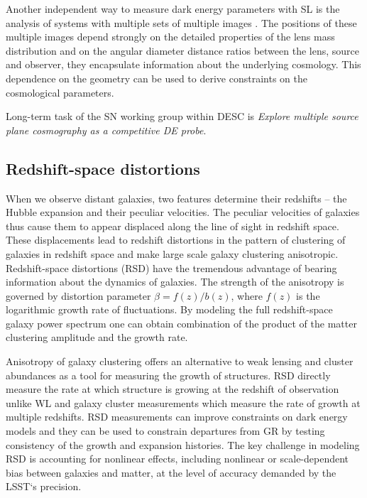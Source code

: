 Another independent way to measure dark energy parameters with SL is the analysis of systems with multiple sets of multiple images \textcite{SL_in_CLGs}. The positions of these multiple images depend strongly on the detailed properties of the lens mass distribution and on the angular diameter distance ratios between the lens, source and observer, they encapsulate information about the underlying cosmology. This dependence on the geometry can be used to derive constraints on the cosmological parameters.

Long-term task of the SN working group within DESC is \textit{Explore multiple source plane cosmography as a competitive DE probe}.
\subsection{Redshift-space distortions}
When we observe distant galaxies, two features determine their redshifts -- the Hubble expansion and their peculiar velocities. The peculiar velocities of galaxies thus cause them to appear displaced along the line of sight in redshift space. These displacements lead to redshift distortions in the pattern of clustering of galaxies in redshift space and make large scale galaxy clustering anisotropic. Redshift-space distortions (RSD) have the tremendous advantage of bearing information about the dynamics of galaxies. The strength of the anisotropy is governed by distortion parameter $\beta = f(z)/b(z)$, where $f(z)$ is the logarithmic growth rate of fluctuations. By modeling the full redshift-space galaxy power spectrum one can obtain combination of the product of the matter clustering amplitude and the growth rate.

Anisotropy of galaxy clustering offers an alternative to weak lensing and cluster abundances as a tool for measuring the growth of structures. RSD directly measure the rate at which structure is growing at the redshift of observation unlike WL and galaxy cluster measurements  which measure the rate of growth at multiple redshifts. RSD measurements can improve constraints on dark energy models and they can be used to constrain departures from GR by testing consistency of the growth and expansion histories. The key challenge in modeling RSD is accounting for nonlinear effects, including nonlinear or scale-dependent bias between galaxies and matter, at the level of accuracy demanded by the LSST`s precision.